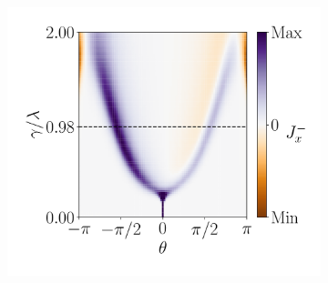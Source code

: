 \begin{figure}[h!]
\begin{minipage}[h!]{1\textwidth}
\begin{subfigure}[b!]{0.35 \textwidth}
             \label{}
         \end{subfigure}\hspace*{-0.5em}
         \begin{subfigure}[b!]{0.35 \textwidth}
             \caption{}
             \includegraphics[width=\textwidth]{Imagenes/Resultados_pump_Cuadrado/xy/current_square_pump_neg.pdf}
             \label{}
         \end{subfigure}\hspace*{-0.5em}
     \end{minipage}\vspace*{-1em}
     

\end{figure}
